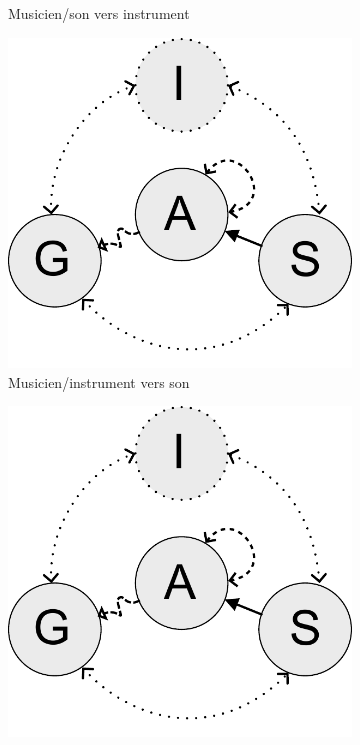 \begin{figure}[!htbp]
{\begin{subfigure}[b]{.33\textwidth}
			\caption{Musicien/son vers instrument}
		\end{subfigure}%
		\hspace{.02\linewidth}
		\begin{subfigure}[b]{.33\textwidth}
			\centering
			\includegraphics[width=0.9\linewidth]{gfx/03_gesture/gesture-inference-a.pdf}
			\caption{Musicien/instrument vers son}
		\end{subfigure}%
		\hspace{.02\linewidth}
		\begin{subfigure}[b]{.33\textwidth}
			\centering
			\includegraphics[width=0.9\linewidth]{gfx/03_gesture/gesture-inference-a.pdf}

\end{subfigure}}
\end{figure}
